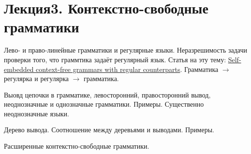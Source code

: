 \section{Лекция3. Контекстно-свободные грамматики}

Лево- и право-линейные грамматики и регулярные языки. Неразрешимость задачи проверки того, что граммтика задаёт регулярный язык. Статья на эту тему: \href{https://link.springer.com/article/10.1007/s00236-003-0133-8}{Self-embedded context-free grammars with regular counterparts}. Грамматика $\to$ регулярка и регулярка $\to$ грамматика.

Выовд цепочки в грамматике, левосторонний, правосторонний вывод, неоднозначные и однозначные грамматики. Примеры.
Существенно неоднозначные языки.

Дерево вывода. Соотношение между деревьями и выводами. Примеры.

Расширенные контекстно-свободные грамматики.